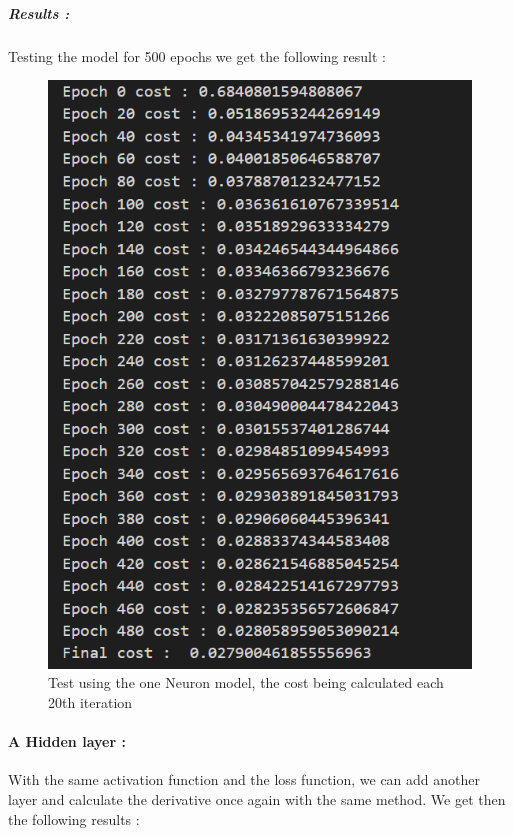 \documentclass[a4paper,12pt,twoside]{report}
\begin{document}
\subparagraph{Results :}
Testing the model for 500 epochs we get the following result :
\begin{figure}[H]
\centering
\includegraphics[scale = 0.6]{lab2_1_cost.png}
\caption{Test using the one Neuron model, the cost being calculated each 20th iteration}
\end{figure}

\paragraph{A Hidden layer :}

With the same activation function and the loss function, we can add another layer and calculate the derivative once again with the same method.
We get then the following results :
\end{document}
